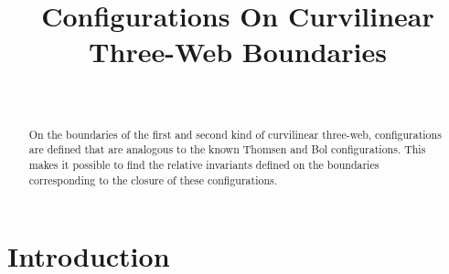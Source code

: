 \documentclass[
11pt,%
tightenlines,%
twoside,%
onecolumn,%
nofloats,%
nobibnotes,%
nofootinbib,%
superscriptaddress,%
noshowpacs,%
centertags]%
{revtex4}
\begin{document}

\title{Configurations On  Curvilinear Three-Web Boundaries}

\author{~}







\begin{abstract} %
On the boundaries of the first and second kind of curvilinear three-web, configurations are defined that are analogous to the known Thomsen and Bol configurations. This makes it possible to find the relative invariants defined on the boundaries corresponding to the closure of these configurations.
\end{abstract}



\maketitle




\section{Introduction}
\label{intro}
\end{document}
